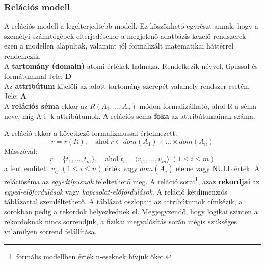 \subsubsection{Relációs modell}
A relációs modell a legelterjedtebb modell. Ez köszönhető egyrészt annak, hogy a
személyi számítógépek elterjedésekor a megjelenő adatbázis-kezelő rendszerek ezen a modellen alapultak, valamint jól formalizált matematikai háttérrel rendelkezik.\\
A \textbf{tartomány (domain)} atomi értékek halmaza. Rendelkezik névvel, típussal és formátummal Jele: \textbf{D}\\
Az \textbf{attribútum} kijelöli az adott tartomány szerepét valamely rendszer esetén. Jele: \textbf{A}\\
A \textbf{relációs séma} ekkor az $R(A_1, ..., A_n)$ módon formalizálható, ahol R a séma neve, míg A i -k attribútumok. A relációs séma \textbf{foka} az attribútumainak száma.

A reláció ekkor a következő formalizmussal értelmezett:
$$r = r(R),\quad \text{ahol}\; r \subset dom(A_1) \times \dots \times dom(A_n)$$
Másszóval:
$$ r = \{t_1,\dots,t_m\},\quad\text{ahol }t_i = \langle v_{i1},\dots,v_{in}\rangle \;(1 \leq i \leq m)$$
a fent említett $v_{ij}\;(1\leq i \leq n)$ érték vagy $dom(A_j)$ eleme vagy NULL érték.
A relációséma az \emph{egyedtípusnak} feleltethető meg. A reláció sorai\footnote{formális modellben érték n-eseknek hívjuk őket.}, azaz  \textbf{rekordjai} az \emph{egyed-előfordulások} vagy \emph{kapcsolat-előfordulások}. A reláció kétdimenziós táblázattal szemléltethető. A táblázat oszlopait az attribútumok címkézik, a sorokban pedig a rekordok helyezkednek el. Megjegyzendő, hogy logikai szinten a rekordoknak nincs sorrendjük, a fizikai megvalósítás során mégis szükséges valamilyen sorrend felállítása.
